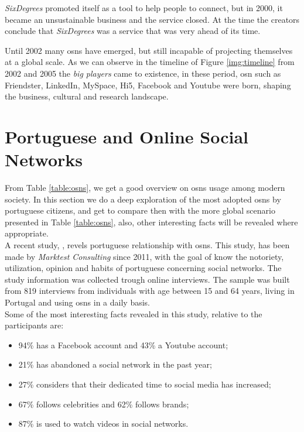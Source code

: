 \textit{SixDegrees} promoted itself as a tool to help people to connect, but in 2000, it became an
unsustainable business and the service closed. At the time the creators conclude that
\textit{SixDegrees} was a service that was very ahead of its time.

Until 2002 many \glspl{osn} have emerged, but still incapable of projecting themselves at a global scale.
As we can observe in the timeline of Figure \ref{img:timeline} from 2002 and 2005 the \textit{big players} came to existence, in these period, \gls{osn}
such as Friendster, LinkedIn, MySpace, Hi5, Facebook and Youtube were born, shaping the business, cultural
and research landscape.


\section{Portuguese and Online Social Networks}
From Table \ref{table:osns}, we get a good overview on \glspl{osn} usage among modern society. In this section we do a deep exploration of the most adopted \glspl{osn} by portuguese citizens,
and get to compare then with the more global scenario presented in Table \ref{table:osns}, also, other interesting facts will be revealed where appropriate.\\
\indent A recent study, \cite{marktest2016}, revels portuguese relationship with \glspl{osn}. This study, has been made by \textit{Marktest Consulting} since 2011, with the goal of know the notoriety, utilization, opinion
and habits of portuguese concerning social networks. The study information was collected trough online interviews. The sample was built from 819 interviews from individuals with age between
15 and 64 years, living in Portugal and using \glspl{osn} in a daily basis.\\
\indent Some of the most interesting facts revealed in this study, relative to the participants are:
\begin{itemize}
  \item 94\% has a Facebook account and 43\% a Youtube account;
  \item 21\% has abandoned a social network in the past year;
  \item 27\% considers that their dedicated time to social media has increased;
  \item 67\% follows celebrities and 62\% follows brands;
  \item 87\% is used to watch videos in social networks.
\end{itemize}

